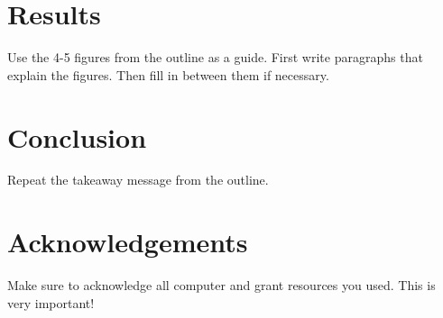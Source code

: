 \documentclass[twocolumn]{revtex4-1}
\begin{document}
\section*{Results} 

Use the 4-5 figures from the outline as a guide. First write paragraphs that explain the figures. Then fill in between them if necessary.

\section*{Conclusion} 

Repeat the takeaway message from the outline. 

\section*{Acknowledgements}

Make sure to acknowledge all computer and grant resources you used. This is very important!


\end{document}
